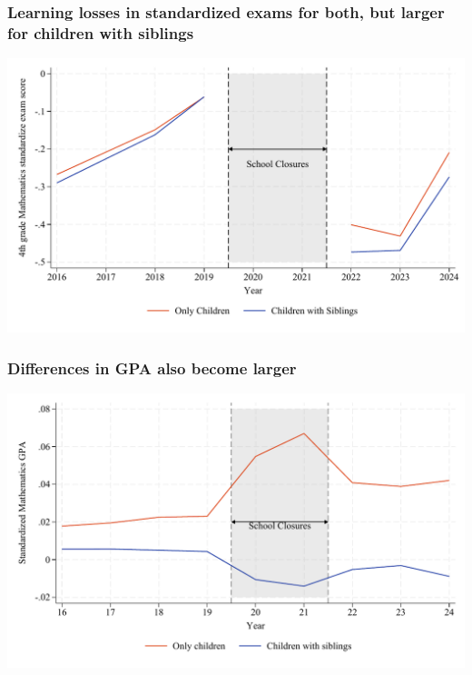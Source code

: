 \documentclass{beamer}
\begin{document}
\begin{frame}
    \label{frame:ece_trends}
    \frametitle{Learning losses in standardized exams for both, but larger for children with siblings}
               \includegraphics[width=\textwidth]{./FIGURES/Descriptive/raw_ece_math_4.pdf}    
    
\end{frame}

\begin{frame}
    \label{frame:gpa_trends}
    \frametitle{Differences in GPA also become larger}
               \includegraphics[width=\textwidth]{./FIGURES/Descriptive/raw_shade_total_elm_std_gpa_m_adj_Tsiblings_Sall_Size2_4.pdf}    
            \hyperlink{frame:gpa_trends_grades_elm}{}
  
\end{frame}
\end{document}
